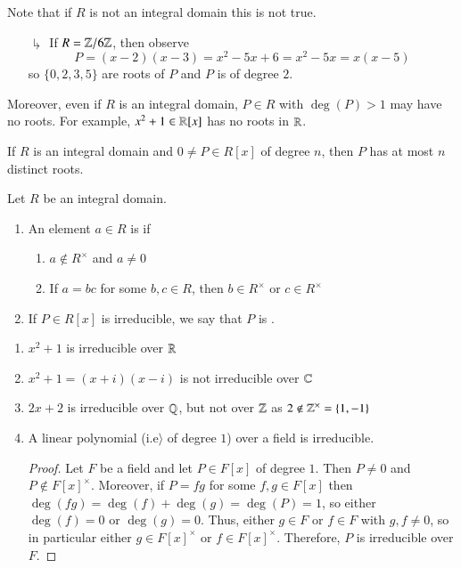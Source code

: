 \documentclass[12pt, a4paper, oneside, openright, titlepage]{book}
\begin{document}
\begin{rmk}
    Note that if $R$ is not an integral domain this is not true.
    \begin{enumerate}
        \item[$\drsh$] If $R = \mathbb Z/6\mathbb Z$, then observe $$P = (x-2)(x-3) = x^2-5x+6 = x^2-5x = x(x-5)$$ 
        so $\{0,2,3,5\}$ are roots of $P$ and $P$ is of degree $2$.
    \end{enumerate}
    Moreover, even if $R$ is an integral domain, $P \in R$ with $\deg(P) > 1$ may have no roots. For example, $x^2+1 \in \mathbb R[x]$ has no roots in $\mathbb R$.
\end{rmk}

\begin{cor}
    If $R$ is an integral domain and $0 \neq P \in R[x]$ of degree $n$, then $P$ has at most $n$ distinct roots.
\end{cor}

\begin{defn}[Irreducible]
    Let $R$ be an integral domain.
    \begin{enumerate}
        \item An element $a \in R$ is  if
        \begin{enumerate}
            \item $a \notin R^{\times}$ and $a \neq 0$
            \item If $a =bc$ for some $b,c \in R$, then $b \in R^{\times}$ or $c \in R^{\times}$
        \end{enumerate}
        \item If $P \in R[x]$ is irreducible, we say that $P$ is .
    \end{enumerate}
\end{defn}

\begin{eg}
    \leavevmode
    \begin{enumerate}
        \item $x^2+1$ is irreducible over $\mathbb R$
        \item $x^2+1 = (x+i)(x-i)$ is not irreducible over $\mathbb C$
        \item $2x+2$ is irreducible over $\mathbb Q$, but not over $\mathbb Z$ as $2 \notin \mathbb Z^{\times} = \{1,-1\}$
        \item A linear polynomial (i.e$\rangle$ of degree $1$) over a field is irreducible.
        \begin{proof}
            Let $F$ be a field and let $P \in F[x]$ of degree $1$. Then $P \neq 0$ and $P \notin F[x]^{\times}$. Moreover, if $P = fg$ for some $f,g \in F[x]$ then $\deg(fg) = \deg(f)+\deg(g) = \deg(P) = 1$, so either $\deg(f) = 0$ or $\deg(g) = 0$. Thus, either $g \in F$ or $f \in F$ with $g,f \neq 0$, so in particular either $g \in F[x]^{\times}$ or $f \in F[x]^{\times}$. Therefore, $P$ is irreducible over $F$.
        \end{proof}
    \end{enumerate}
\end{eg}
\end{document}
